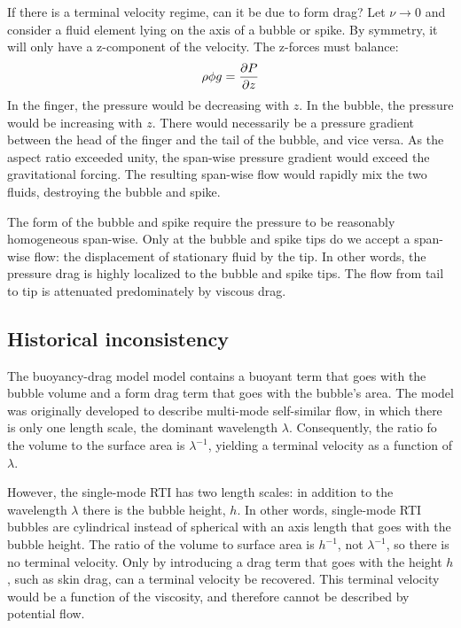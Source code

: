 If there is a terminal velocity regime, can it be due to form drag?
Let $\nu \rightarrow 0$ and consider a fluid element lying on the axis
of a bubble or spike.
By symmetry, it will only have a z-component of the velocity.
The z-forces must balance:
$$ \rho \phi g = \frac{\partial P}{\partial z} $$
In the finger, the pressure would be decreasing with $z$.
In the bubble, the pressure would be increasing with $z$.
There would necessarily be a pressure gradient between the head of the finger and the tail of the bubble, and vice versa.
As the aspect ratio exceeded unity, the span-wise pressure gradient would exceed the gravitational forcing.
The resulting span-wise flow would rapidly mix the two fluids, destroying the bubble and spike.

The form of the bubble and spike require the pressure to be reasonably homogeneous span-wise.
Only at the bubble and spike tips do we accept a span-wise flow: the displacement of stationary fluid by the tip.
In other words, the pressure drag is highly localized to the bubble and spike tips.
The flow from tail to tip is attenuated predominately by viscous drag.

\subsection{Historical inconsistency}

The buoyancy-drag model model contains a buoyant term that goes with the bubble volume and a form drag term that goes with the bubble's area.
The model was originally developed to describe multi-mode self-similar flow, in which there is only one length scale, the dominant wavelength $\lambda$.
Consequently, the ratio fo the volume to the surface area is $\lambda^{-1}$, yielding a terminal velocity as a function of $\lambda$.

However, the single-mode RTI has two length scales: in addition to the wavelength $\lambda$ there is the bubble height, $h$.
In other words, single-mode RTI bubbles are cylindrical instead of spherical with an axis length that goes with the bubble height.
The ratio of the volume to surface area is $h^{-1}$, not $\lambda^{-1}$, so there is no terminal velocity.
Only by introducing a drag term that goes with the height $h$, such as skin drag, can a terminal velocity be recovered.
This terminal velocity would be a function of the viscosity, and therefore cannot be described by potential flow.

